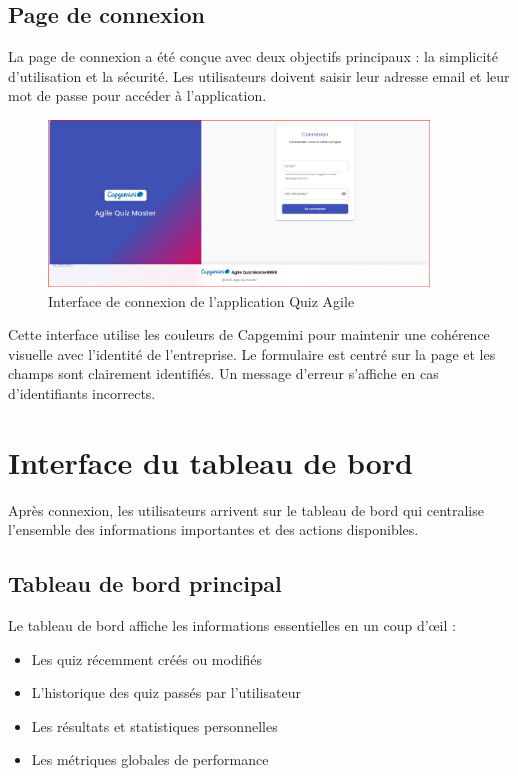 \documentclass[12pt,a4paper]{report}
\begin{document}
\subsection{Page de connexion}

La page de connexion a été conçue avec deux objectifs principaux : la simplicité d'utilisation et la sécurité. Les utilisateurs doivent saisir leur adresse email et leur mot de passe pour accéder à l'application.

\begin{figure}[H]
\centering
\includegraphics[width=0.9\textwidth]{latex_media/media/image51.png}
\caption{Interface de connexion de l'application Quiz Agile}
\label{fig:interface-connexion}
\end{figure}

Cette interface utilise les couleurs de Capgemini pour maintenir une cohérence visuelle avec l'identité de l'entreprise. Le formulaire est centré sur la page et les champs sont clairement identifiés. Un message d'erreur s'affiche en cas d'identifiants incorrects.

\section{Interface du tableau de bord}

Après connexion, les utilisateurs arrivent sur le tableau de bord qui centralise l'ensemble des informations importantes et des actions disponibles.

\subsection{Tableau de bord principal}

Le tableau de bord affiche les informations essentielles en un coup d'œil :

\begin{itemize}
    \item Les quiz récemment créés ou modifiés
    \item L'historique des quiz passés par l'utilisateur
    \item Les résultats et statistiques personnelles
    \item Les métriques globales de performance
\end{itemize}
\end{document}

